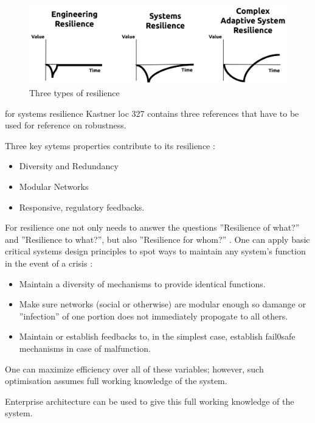 \begin{figure}[h!]
	\centering
	\includegraphics[width=0.7\linewidth]{images/eaal-martin-breen}
	\caption[Three types of resilience]{Three types of resilience \parencite{Botjes2020}}
	\label{fig:eaal-martin-breen}
\end{figure}


\begin{remark}
for systems resilience Kastner loc 327 contains three references that have to be used for reference on robustness.
\end{remark}
Three key sytems properties contribute to its resilience \parencite[p. 9]{MartinBreen2011}:
\begin{itemize}
	\item{Diversity and Redundancy}
	\item{Modular Networks}
	\item{Responsive, regulatory feedbacks.}
\end{itemize}
For resilience one not only needs to answer the questions ''Resilience of what?'' and ''Resilience to what?'', but also ''Resilience for whom?'' \parencite[p. 21]{Lebel2006}. One can apply basic critical systems design principles to spot ways to maintain any system's function in the event of a crisis \parencite[p. 10]{MartinBreen2011}:
\begin{itemize}
	\item{Maintain a diversity of mechanisms to provide identical functions.}
	\item{Make sure networks (social or otherwise) are modular enough so damange or ''infection'' of one portion does not immediately propogate to all others.}
	\item{Maintain or establish feedbacks to, in the simplest case, establish fail0safe mechanisms in case of malfunction.}
\end{itemize}
One can maximize efficiency over all of these variables; however, such optimisation assumes full working knowledge of the system.
\begin{remark}
Enterprise architecture can be used to give this full working knowledge of the system.
\end{remark}

